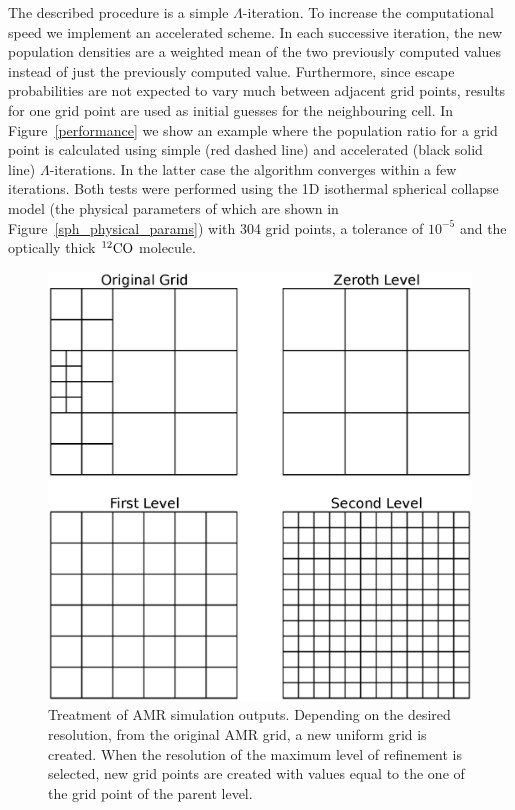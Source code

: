 \documentclass{mn2e}
\begin{document}
The described procedure is a simple $\Lambda$-iteration. To increase the computational speed we implement an accelerated scheme. In each successive iteration, the new population densities are a weighted mean of the two previously computed values instead of just the previously computed value. Furthermore, since escape probabilities are not expected to vary much between adjacent grid points, results for one grid point are used as initial guesses for the neighbouring cell. In Figure~\ref{performance} we show an example where the population ratio for a grid point is calculated using simple (red dashed line) and accelerated (black solid line) $\Lambda$-iterations. In the latter case the algorithm converges within a few iterations. Both tests were performed using the 1D isothermal spherical collapse model (the physical parameters of which are shown in Figure~\ref{sph_physical_params}) with 304 grid points, a tolerance of $10^{-5}$ and the optically thick $\rm{^{12}CO}$ molecule.



\begin{figure}
\includegraphics[width=1.0\columnwidth, clip]{amr_treatment.eps}
\caption{Treatment of AMR simulation outputs. Depending on the desired resolution, from the original AMR grid, a new uniform grid is created. When the resolution of the maximum level of refinement is selected, new grid points are created with values equal to the one of the grid point of the parent level.  
\label{amr_treatment}}
\end{figure}
\end{document}
